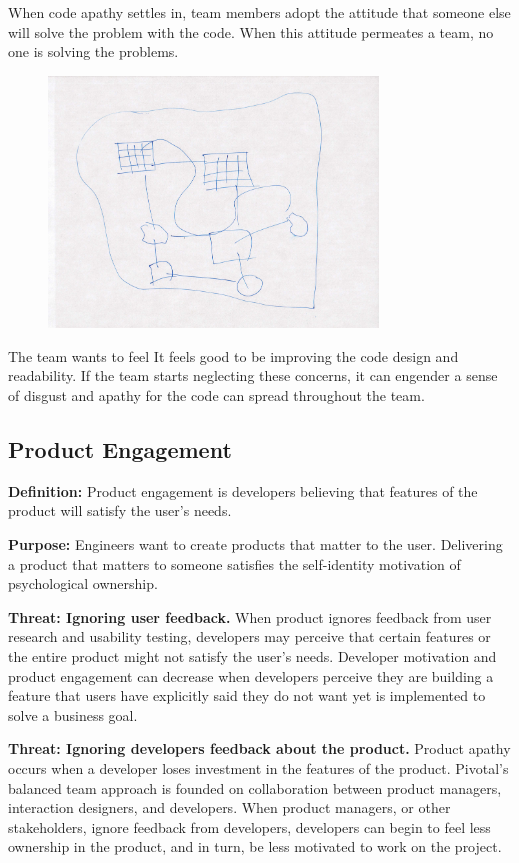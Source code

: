 When code apathy settles in, team members adopt the attitude that someone else will solve the problem with the code. When this attitude permeates a team, no one is solving the problems. 

\begin{figure}[t]
\centering
\includegraphics[width=3.45in]{team_code_ownership_images/CodeOwnership.jpg}
\caption{}
\label{Programmer1}
\end{figure}

The team wants to feel   It feels good to be improving the code design and readability. If the team starts neglecting these concerns, it can engender a sense of disgust and apathy for the code can spread throughout the team.

\subsection{Product Engagement}
\textbf{Definition:} Product engagement is developers believing that features of the product will satisfy the user's needs.

\textbf{Purpose:} Engineers want to create products that matter to the user. Delivering a product that matters to someone satisfies the self-identity motivation of psychological ownership.

\textbf{Threat: Ignoring user feedback.} When product ignores feedback from user research and usability testing, developers may perceive that certain features or the entire product might not satisfy the user's needs. Developer motivation and product engagement can decrease when developers perceive they are building a feature that users have explicitly said they do not want yet is implemented to solve a business goal. 

\textbf{Threat: Ignoring developers feedback about the product.} Product apathy occurs when a developer loses investment in the features of the product. Pivotal's balanced team approach is founded on collaboration between product managers, interaction designers, and developers. When product managers, or other stakeholders, ignore feedback from developers, developers can begin to feel less ownership in the product, and in turn, be less motivated to work on the project. 


